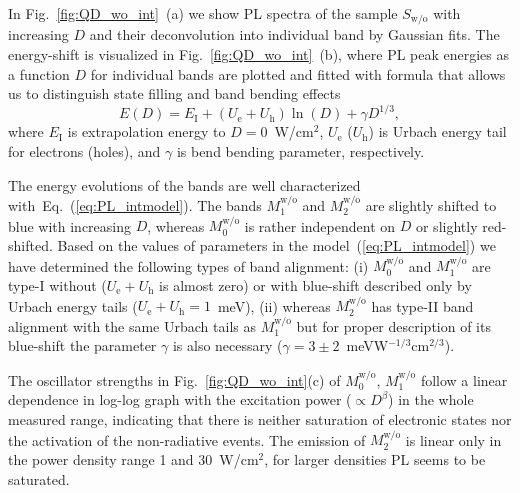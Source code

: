 In Fig.~\ref{fig:QD_wo_int}~(a) we show PL spectra of the sample $S_\mathrm{w/o}$ with increasing $D$ and their deconvolution into individual band by Gaussian fits. The energy-shift is visualized in Fig.~\ref{fig:QD_wo_int}~(b), where PL peak energies as a function $D$ for individual bands are plotted and fitted with %
%
formula that allows us to distinguish state filling and band bending effects~\cite{Abramkin_blueshift_analytical}
%
\begin{equation}
E(D)=E_\mathrm{I}+\left(U_\mathrm{e}+U_\mathrm{h}\right) \ln\left(D \right)+\gamma D^{1/3}, \label{eq:PL_intmodel}
\end{equation}
%
where $E_\mathrm{I}$ is extrapolation energy to $D=0$~W/cm$^2$, $U_\mathrm{e}$ ($U_\mathrm{h}$) is Urbach energy tail for electrons (holes), and $\gamma$ is bend bending parameter, respectively.%

The energy evolutions of the bands are well characterized with~Eq.~(\ref{eq:PL_intmodel}). The bands $M_1^\mathrm{w/o}$ and $M_2^\mathrm{w/o}$ are slightly shifted to blue with increasing $D$, whereas $M_0^\mathrm{w/o}$ is rather independent on $D$ or slightly red-shifted. Based on the values of parameters in the model~(\ref{eq:PL_intmodel}) we have determined the following types of band alignment: (i) $M_0^\mathrm{w/o}$ and $M_1^\mathrm{w/o}$ are type-I without ($U_\mathrm{e}+U_\mathrm{h}$ is almost zero) or with blue-shift described only by Urbach energy tails ($U_\mathrm{e}+U_\mathrm{h}=1$~meV), (ii) whereas $M_2^\mathrm{w/o}$ has type-II band alignment with the same Urbach tails as $M_1^\mathrm{w/o}$ but for proper description of its blue-shift the parameter $\gamma$ is also necessary ($\gamma=3\pm2$~meVW$^{-1/3}$cm$^{2/3}$).


The oscillator strengths in Fig.~\ref{fig:QD_wo_int}(c) of $M_0^\mathrm{w/o}$, $M_1^\mathrm{w/o}$ follow a linear dependence in log-log graph with the excitation power ($\propto D^\beta$) in the whole measured range, indicating that there is neither saturation of electronic states nor the activation of the non-radiative events. The emission of $M_2^\mathrm{w/o}$ is linear only in the power density range 1 and 30~W/cm$^2$, for larger densities PL seems to be saturated.

